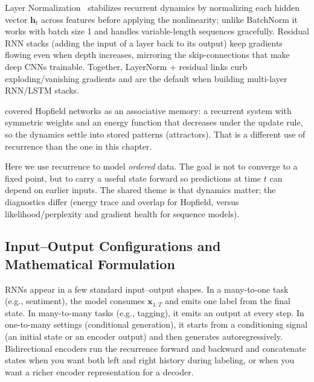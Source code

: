 \begin{tcolorbox}[summarybox, title={LayerNorm and residual RNN tips}]
Layer Normalization~\citep{Ba2016} stabilizes recurrent dynamics by normalizing each hidden vector \(\mathbf{h}_t\) across features before applying the nonlinearity; unlike BatchNorm it works with batch size 1 and handles variable-length sequences gracefully. Residual RNN stacks (adding the input of a layer back to its output) keep gradients flowing even when depth increases, mirroring the skip-connections that make deep CNNs trainable. Together, LayerNorm + residual links curb exploding/vanishing gradients and are the default when building multi-layer RNN/LSTM stacks.
\end{tcolorbox}

\begin{tcolorbox}[summarybox, title={Historical note: Hopfield networks and stable recurrence}]
 covered Hopfield networks as an associative memory: a recurrent system with symmetric weights and an energy function that decreases under the update rule, so the dynamics settle into stored patterns (attractors). That is a different use of recurrence than the one in this chapter.

Here we use recurrence to model \emph{ordered} data. The goal is not to converge to a fixed point, but to carry a useful state forward so predictions at time \(t\) can depend on earlier inputs. The shared theme is that dynamics matter; the diagnostics differ (energy trace and overlap for Hopfield, versus likelihood/perplexity and gradient health for sequence models).
\end{tcolorbox}

\subsection{Input--Output Configurations and Mathematical Formulation}
\label{sec:rnn_input_output_configurations_and_mathematical_formulation}

RNNs appear in a few standard input--output shapes. In a many\hyp{}to\hyp{}one task (e.g., sentiment), the model consumes \(\mathbf{x}_{1:T}\) and emits one label from the final state. In many\hyp{}to\hyp{}many tasks (e.g., tagging), it emits an output at every step. In one\hyp{}to\hyp{}many settings (conditional generation), it starts from a conditioning signal (an initial state or an encoder output) and then generates autoregressively. Bidirectional encoders run the recurrence forward and backward and concatenate states when you want both left and right history during labeling, or when you want a richer encoder representation for a decoder.

